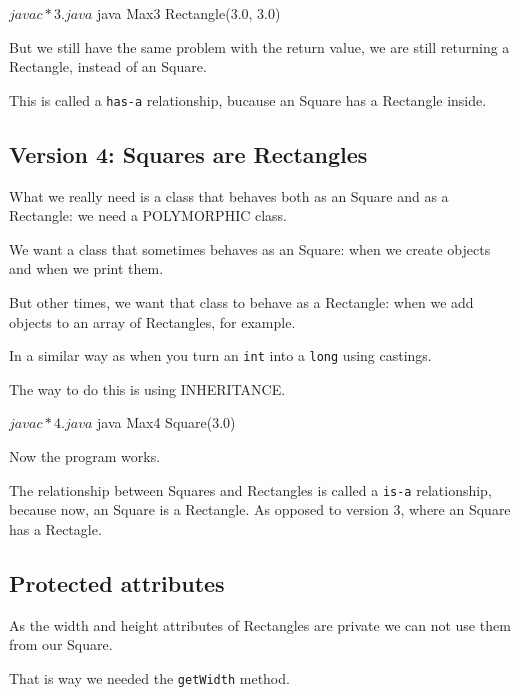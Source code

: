 \documentclass[a4paper, 9pt]{extarticle}
\begin{document}
\begin{blackboard}
$ javac *3.java
$ java Max3
Rectangle(3.0, 3.0)
\end{blackboard}

But we still have the same problem with the return value, we are still
returning a Rectangle, instead of an Square.

This is called a \verb+has-a+ relationship, bucause an Square has a Rectangle
inside.

\subsection{Version 4: Squares are Rectangles}

What we really need is a class that behaves both as an Square and as a
Rectangle: we need a POLYMORPHIC class.

We want a class that sometimes behaves as an Square: when we create objects
and when we print them.

But other times, we want that class to behave as a Rectangle: when we add
objects to an array of Rectangles, for example.

In a similar way as when you turn an \verb+int+ into a \verb+long+ using
castings.

The way to do this is using INHERITANCE.

\begin{multicols}{2}
\columnbreak
\end{multicols}

\begin{blackboard}
$ javac *4.java
$ java Max4
Square(3.0)
\end{blackboard}

Now the program works.

The relationship between Squares and Rectangles is called a \verb+is-a+
relationship, because now, an Square is a Rectangle. As opposed to version 3,
where an Square has a Rectagle.

\subsection{Protected attributes}

As the width and height attributes of Rectangles are private we can not use
them from our Square.

That is way we needed the \verb+getWidth+ method.
\end{document}
